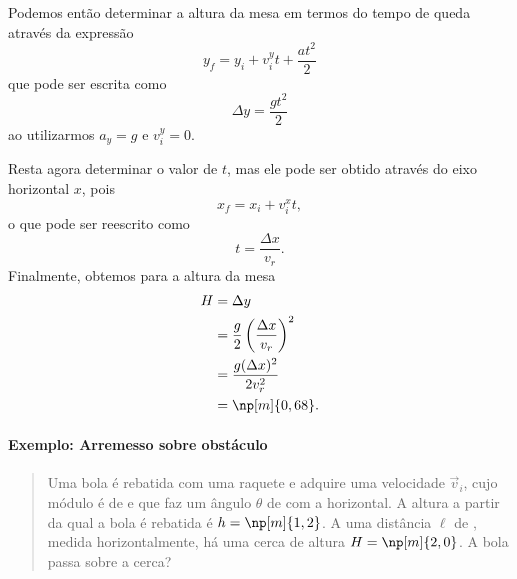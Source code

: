 Podemos então determinar a altura da mesa em termos do tempo de queda através da expressão
\begin{equation}
	y_f = y_i + v_{i}^{y}t + \frac{at^2}{2}
\end{equation}
%
que pode ser escrita como
\begin{equation}
	\Delta y = \frac{gt^2}{2}
\end{equation}
%
ao utilizarmos $a_y = g$ e $v_{i}^{y} = 0$.

Resta agora determinar o valor de $t$, mas ele pode ser obtido através do eixo horizontal $x$, pois
\begin{equation}
	x_f = x_i + v_{i}^{x}t,
\end{equation}
%
o que pode ser reescrito como
\begin{equation}
	t = \frac{\Delta x}{v_r}.
\end{equation}
%
Finalmente, obtemos para a altura da mesa
\begin{align}
	H &= \Delta y \\
	  &= \frac{g}{2} \left(\frac{\Delta x}{v_r}\right)^2 \\
	  &= \frac{g (\Delta x)^2}{2 v_r^2} \\
	  &= \np[m]{0,68}.
\end{align}

\paragraph{Exemplo: Arremesso sobre obstáculo}

\begin{quote}
Uma bola é rebatida com uma raquete e adquire uma velocidade $\vec{v}_i$, cujo módulo é de  e que faz um ângulo $\theta$ de  com a horizontal. A altura a partir da qual a bola é rebatida é $h = \np[m]{1,2}$. A uma distância $\ell$ de , medida horizontalmente, há uma cerca de altura $H = \np[m]{2,0}$. A bola passa sobre a cerca?
\end{quote}

